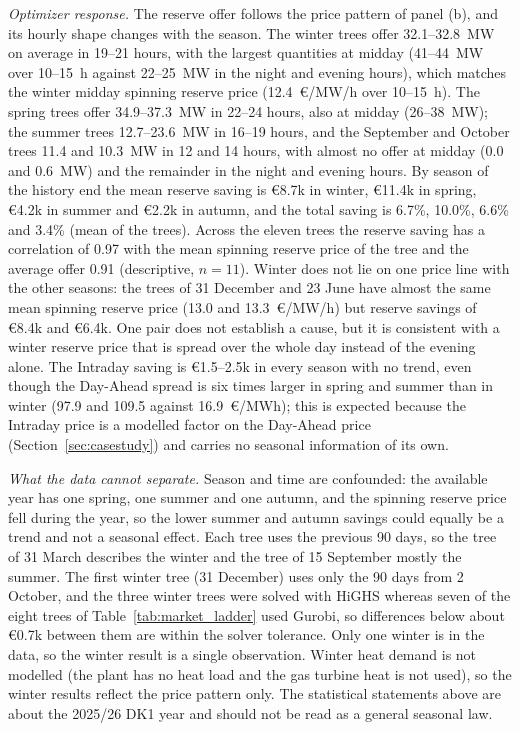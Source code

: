 \documentclass[5p,times,twocolumn]{elsarticle}
\begin{document}
\textit{Optimizer response.} The reserve offer follows the price pattern of panel (b), and its hourly shape changes with the season. The winter trees offer 32.1--32.8~MW on average in 19--21 hours, with the largest quantities at midday (41--44~MW over 10--15~h against 22--25~MW in the night and evening hours), which matches the winter midday spinning reserve price (12.4~\euro/MW/h over 10--15~h). The spring trees offer 34.9--37.3~MW in 22--24 hours, also at midday (26--38~MW); the summer trees 12.7--23.6~MW in 16--19 hours, and the September and October trees 11.4 and 10.3~MW in 12 and 14 hours, with almost no offer at midday (0.0 and 0.6~MW) and the remainder in the night and evening hours. By season of the history end the mean reserve saving is \euro 8.7k in winter, \euro 11.4k in spring, \euro 4.2k in summer and \euro 2.2k in autumn, and the total saving is 6.7\%, 10.0\%, 6.6\% and 3.4\% (mean of the trees). Across the eleven trees the reserve saving has a correlation of 0.97 with the mean spinning reserve price of the tree and the average offer 0.91 (descriptive, $n=11$). Winter does not lie on one price line with the other seasons: the trees of 31 December and 23 June have almost the same mean spinning reserve price (13.0 and 13.3~\euro/MW/h) but reserve savings of \euro 8.4k and \euro 6.4k. One pair does not establish a cause, but it is consistent with a winter reserve price that is spread over the whole day instead of the evening alone. The Intraday saving is \euro 1.5--2.5k in every season with no trend, even though the Day-Ahead spread is six times larger in spring and summer than in winter (97.9 and 109.5 against 16.9~\euro/MWh); this is expected because the Intraday price is a modelled factor on the Day-Ahead price (Section~\ref{sec:casestudy}) and carries no seasonal information of its own.

\textit{What the data cannot separate.} Season and time are confounded: the available year has one spring, one summer and one autumn, and the spinning reserve price fell during the year, so the lower summer and autumn savings could equally be a trend and not a seasonal effect. Each tree uses the previous 90 days, so the tree of 31 March describes the winter and the tree of 15 September mostly the summer. The first winter tree (31 December) uses only the 90 days from 2 October, and the three winter trees were solved with HiGHS whereas seven of the eight trees of Table~\ref{tab:market_ladder} used Gurobi, so differences below about \euro 0.7k between them are within the solver tolerance. Only one winter is in the data, so the winter result is a single observation. Winter heat demand is not modelled (the plant has no heat load and the gas turbine heat is not used), so the winter results reflect the price pattern only. The statistical statements above are about the 2025/26 DK1 year and should not be read as a general seasonal law.
\end{document}
